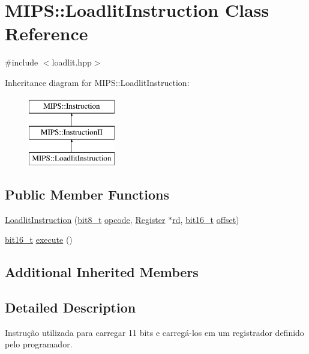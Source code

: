\hypertarget{classMIPS_1_1LoadlitInstruction}{}\section{M\+I\+PS\+:\+:Loadlit\+Instruction Class Reference}
\label{classMIPS_1_1LoadlitInstruction}


{\ttfamily \#include $<$loadlit.\+hpp$>$}

Inheritance diagram for M\+I\+PS\+:\+:Loadlit\+Instruction\+:\begin{figure}[H]
\begin{center}
\leavevmode
\includegraphics[height=3.000000cm]{classMIPS_1_1LoadlitInstruction}
\end{center}
\end{figure}
\subsection*{Public Member Functions}
\begin{DoxyCompactItemize}
\item 
\hyperlink{classMIPS_1_1LoadlitInstruction_a3f6cbb32be8166dcd9996fcd746ca96d}{Loadlit\+Instruction} (\hyperlink{core_8hpp_a6074bae122ae7b527864eec42c728c3c}{bit8\+\_\+t} \hyperlink{classMIPS_1_1Instruction_a45cc6808b5dde8a5d41067d148b55476}{opcode}, \hyperlink{classMIPS_1_1Register}{Register} $\ast$\hyperlink{classMIPS_1_1InstructionII_a2a709b8170f2bf653de2102df9403e1f}{rd}, \hyperlink{core_8hpp_adc265a970bc35995b5879784bbb3f1b7}{bit16\+\_\+t} \hyperlink{classMIPS_1_1InstructionII_ae34cdcf18cd37944dfecb96d5b07b5cb}{offset})
\item 
\hyperlink{core_8hpp_adc265a970bc35995b5879784bbb3f1b7}{bit16\+\_\+t} \hyperlink{classMIPS_1_1LoadlitInstruction_a9f88a932bbbf31375da7686b449608e1}{execute} ()
\end{DoxyCompactItemize}
\subsection*{Additional Inherited Members}


\subsection{Detailed Description}
Instrução utilizada para carregar 11 bits e carregá-\/los em um registrador definido pelo programador.

